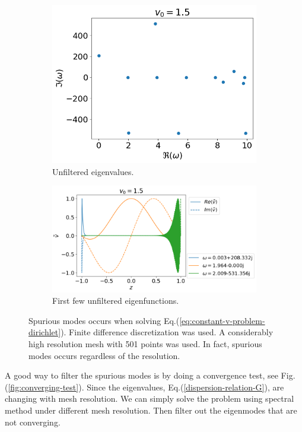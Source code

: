 \begin{figure}[htbp]	
  \centering
	\begin{subfigure}[b]{0.4\linewidth}
		\includegraphics[width=\linewidth]{figures/eigvals-bad} 
		\caption{Unfiltered eigenvalues.}
	\end{subfigure}%
	\begin{subfigure}[b]{0.6\linewidth}
		\includegraphics[width=\linewidth]{figures/eigvecs-bad} 
		\caption{First few unfiltered eigenfunctions.}
	\end{subfigure}
  \caption{Spurious modes occurs when solving Eq.(\ref{eq:constant-v-problem-dirichlet}). Finite difference discretization was used. A considerably high resolution mesh with 501 points was used. In fact, spurious modes occurs regardless of the resolution.}
	\label{fig:results-bad}
\end{figure}

A good way to filter the spurious modes is by doing a convergence test, see Fig.(\ref{fig:converging-test}). Since the eigenvalues, Eq.(\ref{dispersion-relation-G}), are changing with mesh resolution. We can simply solve the problem using spectral method under different mesh resolution. Then filter out the eigenmodes that are not converging.

